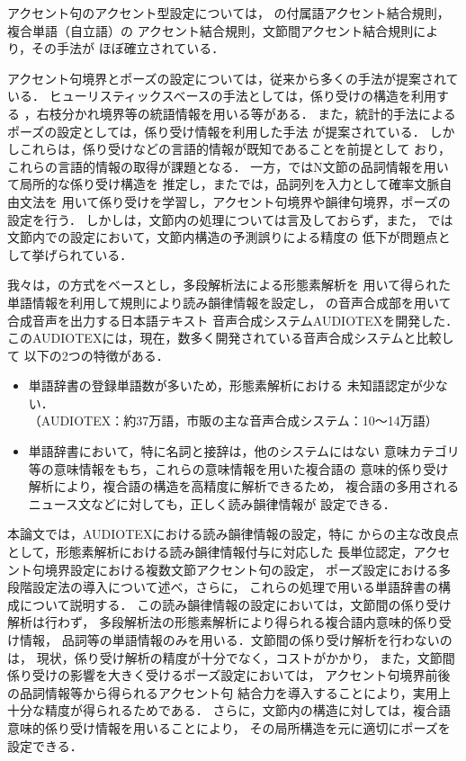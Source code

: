 アクセント句のアクセント型設定については，
\cite{Sagisaka}の付属語アクセント結合規則，複合単語（自立語）の
アクセント結合規則，文節間アクセント結合規則により，その手法が
ほぼ確立されている．

アクセント句境界とポーズの設定については，従来から多くの手法が提案されている．
ヒューリスティックスベースの手法としては，係り受けの構造を利用する
\cite{Hakoda1}，右枝分かれ境界等の統語情報を用いる\cite{Kawai}等がある．
また，統計的手法によるポーズの設定としては，係り受け情報を利用した手法
\cite{Kaiki}が提案されている．
しかしこれらは，係り受けなどの言語的情報が既知であることを前提として
おり，これらの言語的情報の取得が課題となる．
一方，\cite{Suzuki}ではN文節の品詞情報を用いて局所的な係り受け構造を
推定し，また\cite{Fujio}では，品詞列を入力として確率文脈自由文法を
用いて係り受けを学習し，アクセント句境界や韻律句境界，ポーズの設定を行う．
しかし\cite{Suzuki}は，文節内の処理については言及しておらず，また，
\cite{Fujio}では文節内での設定において，文節内構造の予測誤りによる精度の
低下が問題点として挙げられている．

我々は，\cite{Miyazaki1}の方式をベースとし，多段解析法による形態素解析を
用いて得られた単語情報を利用して規則により読み韻律情報を設定し，
\cite{Hakoda2}の音声合成部を用いて合成音声を出力する日本語テキスト
音声合成システムAUDIOTEXを開発した．
このAUDIOTEXには，現在，数多く開発されている音声合成システムと比較して
以下の2つの特徴がある．
\begin{itemize}
\item 単語辞書の登録単語数が多いため，形態素解析における
未知語認定が少ない．\\
（AUDIOTEX：約37万語，市販の主な音声合成システム：10〜14万語）
\item 単語辞書において，特に名詞と接辞は，他のシステムにはない
意味カテゴリ等の意味情報をもち，これらの意味情報を用いた複合語の
意味的係り受け解析により，複合語の構造を高精度に解析できるため，
複合語の多用されるニュース文などに対しても，正しく読み韻律情報が
設定できる．
\end{itemize}

本論文では，AUDIOTEXにおける読み韻律情報の設定，特に\cite{Miyazaki1}
からの主な改良点として，形態素解析における読み韻律情報付与に対応した
長単位認定，アクセント句境界設定における複数文節アクセント句の設定，
ポーズ設定における多段階設定法の導入について述べ，さらに，
これらの処理で用いる単語辞書の構成について説明する．
この読み韻律情報の設定においては，文節間の係り受け解析は行わず，
多段解析法の形態素解析により得られる複合語内意味的係り受け情報，
品詞等の単語情報のみを用いる．文節間の係り受け解析を行わないのは，
現状，係り受け解析の精度が十分でなく，コストがかかり，
また，文節間係り受けの影響を大きく受けるポーズ設定においては，
アクセント句境界前後の品詞情報等から得られるアクセント句
結合力を導入することにより，実用上十分な精度が得られるためである．
さらに，文節内の構造に対しては，複合語意味的係り受け情報を用いることにより，
その局所構造を元に適切にポーズを設定できる．

